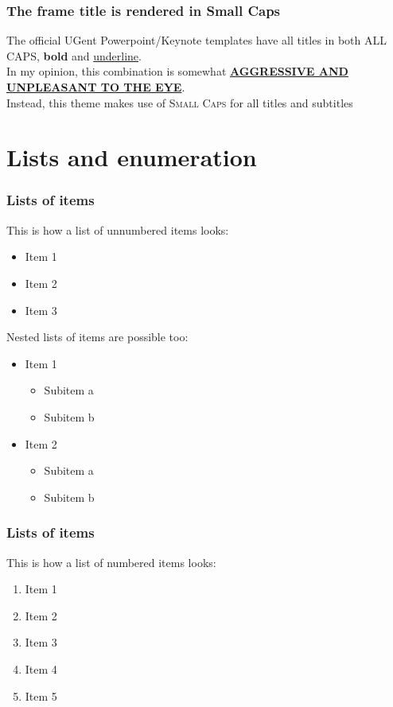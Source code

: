 \documentclass[aspectratio=169]{beamer}
\begin{document}
\begin{frame}
    \frametitle{The frame title is rendered in Small Caps}
    The official UGent Powerpoint/Keynote templates have all titles in both ALL CAPS, \textbf{bold} and \underline{underline}.\\[.5cm]
    In my opinion, this combination is somewhat \underline{\textbf{AGGRESSIVE AND UNPLEASANT TO THE EYE}}.\\[.5cm]
    Instead, this theme makes use of \textsc{Small Caps} for all titles and subtitles
\end{frame}


\section{Lists and enumeration}

\begin{frame}
    \frametitle{Lists of items}
    This is how a list of unnumbered items looks:
    \begin{itemize}
        \item Item 1
        \item Item 2
        \item Item 3
    \end{itemize}
    \vspace{.25cm}
    Nested lists of items are possible too:
    \begin{itemize}
        \item Item 1
            \begin{itemize}
                \item Subitem a
                \item Subitem b
            \end{itemize}
        \item Item 2
            \begin{itemize}
                \item Subitem a
                \item Subitem b
            \end{itemize}
    \end{itemize}
\end{frame}

\begin{frame}
    \frametitle{Lists of items}
    This is how a list of numbered items looks:\\[.25cm]
    \begin{enumerate}
        \itemsep.5cm
        \item Item 1
        \item Item 2
        \item Item 3
        \item Item 4
        \item Item 5
    \end{enumerate}
\end{frame}
\end{document}
